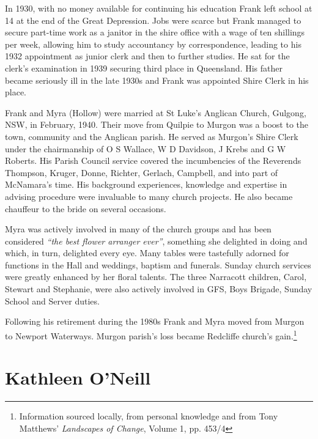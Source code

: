In 1930, with no money available for continuing his education Frank left school at 14 at the end of the Great Depression. Jobs were scarce but Frank managed to secure part-time work as a janitor in the shire office with a wage of ten shillings per week, allowing him to study accountancy by correspondence, leading to his 1932 appointment as junior clerk and then to further studies. He sat for the clerk's examination in 1939 securing third place in Queensland. His father became seriously ill in the late 1930s and Frank was appointed Shire Clerk in his place.



Frank and Myra (Hollow) were married at St Luke's Anglican Church, Gulgong, NSW, in February, 1940. Their move from Quilpie to Murgon was a boost to the town, community and the Anglican parish. He served as Murgon's Shire Clerk under the chairmanship of O S Wallace, W D Davidson, J Krebs and G W Roberts. His Parish Council service covered the incumbencies of the Reverends Thompson, Kruger, Donne, Richter, Gerlach, Campbell, and into part of McNamara's time. His background experiences, knowledge and expertise in advising procedure were invaluable to many church projects. He also became chauffeur to the bride on several occasions.



Myra was actively involved in many of the church groups and has been considered \emph{``the best flower arranger ever''}, something she delighted in doing and which, in turn, delighted every eye. Many tables were tastefully adorned for functions in the Hall and weddings, baptism and funerals. Sunday church services were greatly enhanced by her floral talents. The three Narracott children, Carol, Stewart and Stephanie, were also actively involved in GFS, Boys Brigade, Sunday School and Server duties.



Following his retirement during the 1980s Frank and Myra moved from Murgon to Newport Waterways. Murgon parish's loss became Redcliffe church's gain.\footnote{Information sourced locally, from personal knowledge and from Tony Matthews' \emph{Landscapes of Change}, Volume 1, pp. 453/4}


\section{Kathleen O'Neill}



